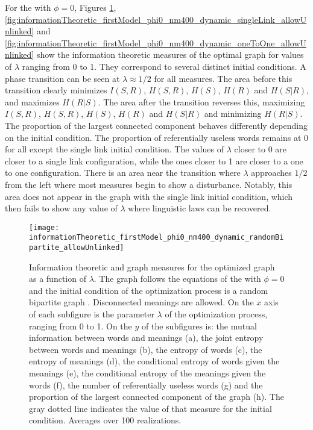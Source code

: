 For the \firstmodel{} with $\phi=0$, Figures \ref{fig:informationTheoretic_firstModel_phi0_nm400_dynamic_randomBipartite_allowUnlinked}, \ref{fig:informationTheoretic_firstModel_phi0_nm400_dynamic_singleLink_allowUnlinked} and \ref{fig:informationTheoretic_firstModel_phi0_nm400_dynamic_oneToOne_allowUnlinked} show the information theoretic measures of the optimal graph for values of $\lambda$ ranging from 0 to 1.
They correspond to several distinct initial conditions.
A phase transition can be seen at $\lambda \approx 1/2$ for all measures.
The area before this transition clearly minimizes $I(S,R)$, $H(S,R)$, $H(S)$, $H(R)$ and $H(S|R)$, and maximizes $H(R|S)$.
The area after the transition reverses this, maximizing $I(S,R)$, $H(S,R)$, $H(S)$, $H(R)$ and $H(S|R)$ and minimizing $H(R|S)$.
The proportion of the largest connected component behaves differently depending on the initial condition.
The proportion of referentially useless words remains at 0 for all except the single link initial condition.
The values of $\lambda$ closer to 0 are closer to a single link configuration, while the ones closer to 1 are closer to a one to one configuration.
There is an area near the transition where $\lambda$ approaches $1/2$ from the left where most measures begin to show a disturbance.
Notably, this area does not appear in the graph with the single link initial condition, which then fails to show any value of $\lambda$ where linguistic laws can be recovered.

\begin{figure}
  \centering
  \texttt{[image: informationTheoretic\_firstModel\_phi0\_nm400\_dynamic\_randomBipartite\_allowUnlinked]}
  \caption{
    Information theoretic and graph measures for the optimized graph as a function of $\lambda$.
    The graph follows the equations of the \firstmodel{} with $\phi=0$ and the initial condition of the optimization process is a random bipartite graph . Disconnected meanings are allowed.
    On the $x$ axis of each subfigure is the parameter $\lambda$ of the optimization process, ranging from 0 to 1.
    On the $y$ of the subfigures is: the mutual information between words and meanings (a), the joint entropy between words and meanings (b), the entropy of words (c), the entropy of meanings (d), the conditional entropy of words given the meanings (e), the conditional entropy of the meanings given the words (f), the number of referentially useless words (g) and the proportion of the largest connected component of the graph (h).
    The gray dotted line indicates the value of that measure for the initial condition.
    Averages over 100 realizations.
}
  \label{fig:informationTheoretic_firstModel_phi0_nm400_dynamic_randomBipartite_allowUnlinked}
\end{figure}

